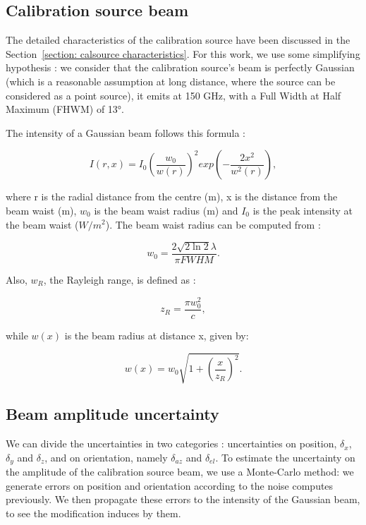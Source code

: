 \documentclass[../../thesis.tex]{subfiles}
\begin{document}
\subsection{Calibration source beam}
The detailed characteristics of the calibration source have been discussed in the Section~\ref{section: calsource characteristics}. For this work, we use some simplifying hypothesis : we consider that the calibration source's beam is perfectly Gaussian (which is a reasonable assumption at long distance, where the source can be considered as a point source), it emits at 150 GHz, with a Full Width at Half Maximum (FHWM) of 13°.

The intensity of a Gaussian beam follows this formula :

\begin{equation}
    I(r, x) = I_0 (\frac{w_0}{w(r)})^2 exp(-\frac{2x^2}{w^2(r)}),
\end{equation}

where r is the radial distance from the centre (m), x is the distance from the beam waist (m), $w_0$ is the beam waist radius (m) and $I_0$ is the peak intensity at the beam waist ($W/m^2$). The beam waist radius can be computed from :

\begin{equation}
    w_0 = \frac{2 \sqrt{2 \ln2} \lambda}{\pi FWHM}.
\end{equation}

Also, $w_R$, the Rayleigh range, is defined as :

\begin{equation}
    z_R = \frac{\pi w_0^2}{c},
\end{equation}

while $w(x)$ is the beam radius at distance x, given by:

\begin{equation}
    w(x) = w_0 \sqrt{1 + (\frac{x}{z_R})^2}.
\end{equation}

\subsection{Beam amplitude uncertainty}
We can divide the uncertainties in two categories : uncertainties on position, $\delta_x$, $\delta_y$ and $\delta_z$, and on orientation, namely $\delta_{az}$ and $\delta_{el}$. To estimate the uncertainty on the amplitude of the calibration source beam, we use a Monte-Carlo method: we generate errors on position and orientation according to the noise computes previously. We then propagate these errors to the intensity of the Gaussian beam, to see the modification induces by them.
\end{document}
